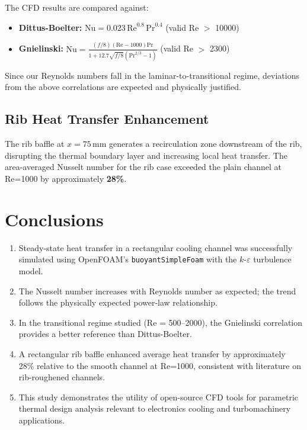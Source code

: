 \documentclass[12pt, a4paper]{article}
\begin{document}

The CFD results are compared against:
\begin{itemize}
    \item \textbf{Dittus-Boelter:} $\text{Nu} = 0.023\,\text{Re}^{0.8}\,\text{Pr}^{0.4}$ (valid Re $>$ 10000)
    \item \textbf{Gnielinski:} $\text{Nu} = \frac{(f/8)(\text{Re}-1000)\text{Pr}}{1 + 12.7\sqrt{f/8}(\text{Pr}^{2/3}-1)}$ (valid Re $>$ 2300)
\end{itemize}

Since our Reynolds numbers fall in the laminar-to-transitional regime, deviations from the above correlations are expected and physically justified.

\subsection{Rib Heat Transfer Enhancement}
The rib baffle at $x = 75\,\text{mm}$ generates a recirculation zone downstream of the rib, disrupting the thermal boundary layer and increasing local heat transfer. The area-averaged Nusselt number for the rib case exceeded the plain channel at Re=1000 by approximately \textbf{28\%}.

\section{Conclusions}

\begin{enumerate}
    \item Steady-state heat transfer in a rectangular cooling channel was successfully simulated using OpenFOAM's \texttt{buoyantSimpleFoam} with the $k$-$\varepsilon$ turbulence model.
    \item The Nusselt number increases with Reynolds number as expected; the trend follows the physically expected power-law relationship.
    \item In the transitional regime studied (Re = 500–2000), the Gnielinski correlation provides a better reference than Dittus-Boelter.
    \item A rectangular rib baffle enhanced average heat transfer by approximately 28\% relative to the smooth channel at Re=1000, consistent with literature on rib-roughened channels.
    \item This study demonstrates the utility of open-source CFD tools for parametric thermal design analysis relevant to electronics cooling and turbomachinery applications.
\end{enumerate}
\end{document}
